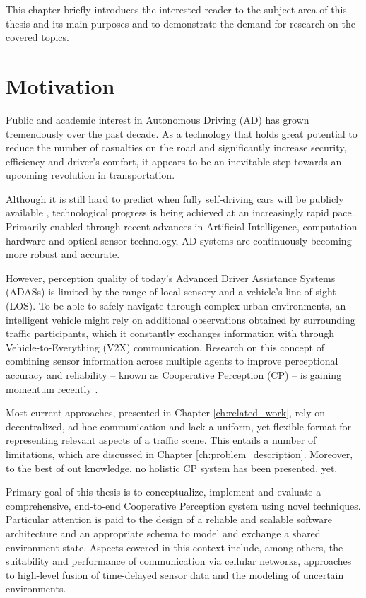This chapter briefly introduces the interested reader to the subject area of this thesis and its main purposes and to demonstrate the demand for research on the covered topics. 

\section{Motivation}
\label{sec:motivation}
Public and academic interest in Autonomous Driving (AD) has grown tremendously over the past decade. As a technology that holds great potential to reduce the number of casualties on the road and significantly increase security, efficiency and driver's comfort, it appears to be an inevitable step towards an upcoming revolution in transportation.

Although it is still hard to predict when fully self-driving cars will be publicly available \cite{Frost&SulivanConsulting2018}, technological progress is being achieved at an increasingly rapid pace. Primarily enabled through recent advances in Artificial Intelligence, computation hardware and optical sensor technology, AD systems are continuously becoming more robust and accurate.

However, perception quality of today's Advanced Driver Assistance Systems (ADASs) is limited by the range of local sensory and a vehicle's line-of-sight (LOS). To be able to safely navigate through complex urban environments, an intelligent vehicle might rely on additional observations obtained by surrounding traffic participants, which it constantly exchanges information with through Vehicle-to-Everything (V2X) communication. Research on this concept of combining sensor information across multiple agents to improve perceptional accuracy and reliability – known as Cooperative Perception (CP) – is gaining momentum recently \cite{Chen2019, Thandavarayan2019, Calvo2017}.

Most current approaches, presented in Chapter \ref{ch:related_work}, rely on decentralized, ad-hoc communication and lack a uniform, yet flexible format for representing relevant aspects of a traffic scene. This entails a number of limitations, which are discussed in Chapter \ref{ch:problem_description}. Moreover, to the best of out knowledge, no holistic CP system has been presented, yet. 

Primary goal of this thesis is to conceptualize, implement and evaluate a comprehensive, end-to-end Cooperative Perception system using novel techniques. Particular attention is paid to the design of a reliable and scalable software architecture and an appropriate schema to model and exchange a shared environment state. Aspects covered in this context include, among others, the suitability and performance of communication via cellular networks, approaches to high-level fusion of time-delayed sensor data and the modeling of uncertain environments. 